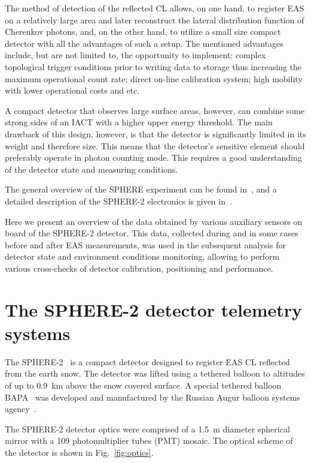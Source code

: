 \documentclass[universe,article,submit,moreauthors,pdftex]{Definitions/mdpi}
\begin{document}
The method of detection of the reflected CL allows, on one hand, to register EAS on a relatively large area and later reconstruct the lateral distribution function of Cherenkov photons, and, on the other hand, to utilize a small size compact detector with all the advantages of such a setup. The mentioned advantages include, but are not limited to, the opportunity to implement: complex topological trigger conditions prior to writing data to storage thus increasing the maximum operational count rate; direct on-line calibration system; high mobility with lower operational costs and etc.

A compact detector that observes large surface areas, however, can combine some strong sides of an IACT with a higher upper energy threshold. The main drawback of this design, however, is that the detector is significantly limited in its weight and therefore size. This means that the detector's sensitive element should preferably operate in photon counting mode. This requires a good understanding of the detector state and measuring conditions.

The general overview of the SPHERE experiment can be found in~\cite{Ant15a}, and a detailed description of the SPHERE-2 electronics is given in~\cite{Ant20}.


Here we present an overview of the data obtained by various auxiliary sensors on board of the SPHERE-2 detector. This data, collected during and in some cases before and after EAS measurements, was used in the subsequent analysis for detector state and environment conditions monitoring, allowing to perform various cross-checks of detector calibration, positioning and performance.


\section{The SPHERE-2 detector telemetry systems}
\label{sect:detector}
The \mbox{SPHERE-2}~\cite{Ant20} is a compact detector designed to register EAS CL reflected from the earth snow. The detector was lifted using a tethered balloon to altitudes of up to 0.9~km above the snow covered surface. A special tethered balloon BAPA~\cite{Ant20} was developed and manufactured by the Russian Augur balloon systems agency~\cite{Augur}.

The \mbox{SPHERE-2} detector optics were comprised of a 1.5~m diameter spherical mirror with a 109 photomultiplier tubes (PMT) mosaic. The optical scheme of the detector is shown in Fig.~\ref{fig:optics}.
\end{document}
